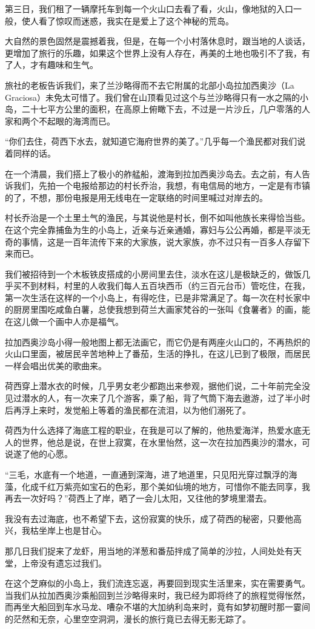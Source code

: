\par 第三日，我们租了一辆摩托车到每一个火山口去看了看，火山，像地狱的入口一般，使人看了惊叹而迷惑，我实在是爱上了这个神秘的荒岛。
\par 大自然的景色固然是震撼着我，但是，在每一个小村落休息时，跟当地的人谈话，更增加了旅行的乐趣，如果这个世界上没有人存在，再美的土地也吸引不了我，有了人，才有趣味和生气。
\par 旅社的老板告诉我们，来了兰沙略得而不去它附属的北部小岛拉加西奥沙（La Graciosa）未免太可惜了。我们曾在山顶看见过这个与兰沙略得只有一水之隔的小岛，二十七平方公里的面积，在高原上俯瞰下去，不过是一片沙丘，几户零落的人家和两个不起眼的海湾而已。
\par “你们去住，荷西下水去，就知道它海府世界的美了。”几乎每一个渔民都对我们说着同样的话。
\par 在一个清晨，我们搭上了极小的舴艋船，渡海到拉加西奥沙岛去。去之前，有人告诉我们，先拍一个电报给那边的村长乔治，我想，有电信局的地方，一定是有市镇的了，不想，那份电报是用无线电在一定联络的时间里喊过对岸去的。
\par 村长乔治是一个土里土气的渔民，与其说他是村长，倒不如叫他族长来得恰当些。在这个完全靠捕鱼为生的小岛上，近亲与近亲通婚，寡妇与公公再婚，都是平淡无奇的事情，这是一百年流传下来的大家族，说大家族，亦不过只有一百多人存留下来而已。
\par 我们被招待到一个木板铁皮搭成的小房间里去住，淡水在这儿是极缺乏的，做饭几乎买不到材料，村里的人收我们每人五百块西币（约三百元台币）管吃住，在我，第一次生活在这样的一个小岛上，有得吃住，已是非常满足了。每一次在村长家中的厨房里围吃咸鱼白薯，总使我想到荷兰大画家梵谷的一张叫《食薯者》的画，能在这儿做一个画中人亦是福气。
\par 拉加西奥沙岛小得一般地图上都无法画它，而它仍是有两座火山口的，不再热炽的火山口里面，被居民辛苦地种上了番茄，生活的挣扎，在这儿已到了极限，而居民一样会唱出优美的歌曲来。
\par 荷西穿上潜水衣的时候，几乎男女老少都跑出来参观，据他们说，二十年前完全没见过潜水的人，有一次来了几个游客，乘了船，背了气筒下海去遨游，过了半小时后再浮上来时，发觉船上等着的渔民都在流泪，以为他们溺死了。
\par 荷西为什么选择了海底工程的职业，在我是可以了解的，他热爱海洋，热爱水底无人的世界，他总是说，在世上寂寞，在水里怡然，这一次在拉加西奥沙的潜水，可说遂了他的心愿。
\par “三毛，水底有一个地道，一直通到深海，进了地道里，只见阳光穿过飘浮的海藻，化成千红万紫亮如宝石的色彩，那个美如仙境的地方，可惜你不能去同享，我再去一次好吗？”荷西上了岸，晒了一会儿太阳，又往他的梦境里潜去。
\par 我没有去过海底，也不希望下去，这份寂寞的快乐，成了荷西的秘密，只要他高兴，我枯坐岸上也是甘心。
\par 那几日我们捉来了龙虾，用当地的洋葱和番茄拌成了简单的沙拉，人间处处有天堂，上帝没有遗忘过我们。
\par 在这个芝麻似的小岛上，我们流连忘返，再要回到现实生活里来，实在需要勇气。当我们从拉加西奥沙乘船回到兰沙略得来时，我已经为即将终了的旅程觉得怅然，而再坐大船回到车水马龙、嘈杂不堪的大加纳利岛来时，竟有如梦初醒时那一霎间的茫然和无奈，心里空空洞洞，漫长的旅行竟已去得无影无踪了。
